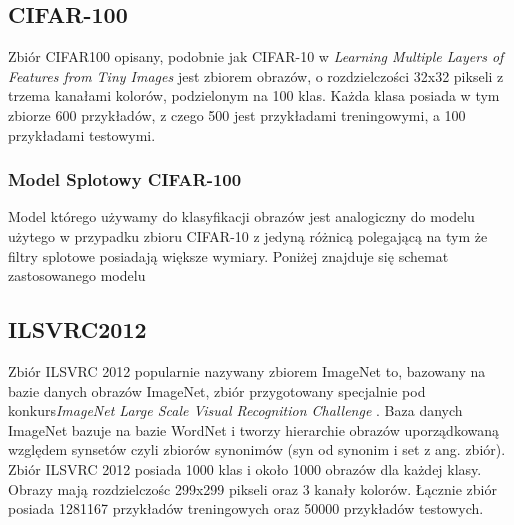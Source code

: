 \documentclass[
    left=2.5cm,         %
    right=2.5cm,        %
    top=2.5cm,          %
    bottom=3cm,         %
    bindingoffset=6mm,  %
    nohyphenation=false %
]{eiti/eiti-thesis}
\begin{document}
    \subsection{CIFAR-100}
    Zbiór CIFAR100 opisany, podobnie jak CIFAR-10 w  \textit{Learning Multiple Layers of Features from Tiny Images} \cite{Krizhevsky2009LearningML}
    jest zbiorem obrazów, o rozdzielczości 32x32 pikseli z trzema kanałami kolorów, podzielonym na 100 klas.
    Każda klasa posiada w tym zbiorze 600 przykładów, z czego 500 jest przykładami treningowymi, a 100 przykładami testowymi.
        \subsubsection{Model Splotowy CIFAR-100}
        Model którego używamy do klasyfikacji obrazów jest analogiczny do modelu użytego w przypadku zbioru CIFAR-10 z jedyną różnicą polegającą na
        tym że filtry splotowe posiadają większe wymiary. Poniżej znajduje się schemat zastosowanego modelu

    \subsection{ILSVRC2012}\label{ILSVRC2012}
        Zbiór ILSVRC 2012 popularnie nazywany zbiorem ImageNet to, bazowany na bazie danych obrazów ImageNet, zbiór
        przygotowany specjalnie pod konkurs\textit{ImageNet Large Scale Visual Recognition Challenge} \cite{ILSVRC15}.
        Baza danych ImageNet bazuje na bazie WordNet i tworzy hierarchie obrazów uporządkowaną względem synsetów
        czyli zbiorów synonimów (syn od synonim i set z ang. zbiór). Zbiór ILSVRC 2012 posiada 1000 klas i około 1000
        obrazów dla każdej klasy. Obrazy mają rozdzielczośc 299x299 pikseli oraz 3 kanały kolorów. Łącznie zbiór posiada
        1281167 przykładów treningowych oraz 50000 przykładów testowych.
\end{document}
